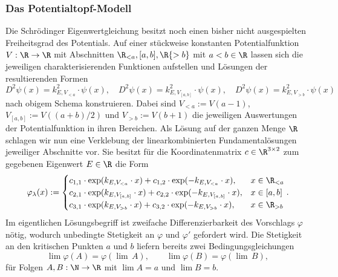 \documentclass[../main.tex]{subfiles}
\begin{document}
        \subsubsection{Das Potentialtopf-Modell}
            Die Schrödinger Eigenwertgleichung besitzt noch einen bisher nicht ausgespielten Freiheitsgrad des Potentials. Auf einer stückweise konstanten Potentialfunktion $V:\R\to\R$ mit Abschnitten $\R_{<a},[a,b],\R{>b}$ mit $a<b\in\R$ lassen sich die jeweiligen charakterisierenden Funktionen aufstellen und Lösungen der resultierenden Formen 
            \[
                D^2\psi(x) = k_{E,V_{<a}}^2\cdot\psi(x),\quad D^2\psi(x) = k_{E,V_{[a,b]}}^2\cdot\psi(x),\quad D^2\psi(x) = k_{E,V_{>b}}^2\cdot\psi(x)
            \] 
            nach obigem Schema konstruieren. Dabei sind $V_{<a}:=V(a - 1)$, $V_{[a,b]}:=V((a + b) / 2)$ und $V_{>b}:=V(b + 1)$ die jeweiligen Auswertungen der Potentialfunktion in ihren Bereichen. Als Lösung auf der ganzen Menge $\R$ schlagen wir nun eine Verklebung der linearkombinierten Fundamentalösungen jeweiliger Abschnitte vor. Sie besitzt für die Koordinatenmatrix $c\in\R^{3\times 2}$ zum gegebenen Eigenwert $E\in\R$ die Form 
            \[
                \varphi_\lambda(x) := \begin{cases}
                    c_{1,1}\cdot \exp(k_{E,V_{<a}}\cdot x) + c_{1,2}\cdot \exp(-k_{E,V_{<a}}\cdot x), & x \in\R_{<a} \\
                    c_{2,1}\cdot \exp(k_{E,V_{[a,b]}}\cdot x) + c_{2,2}\cdot \exp(-k_{E,V_{[a,b]}}\cdot x), & x \in[a,b] \\
                    c_{3,1}\cdot \exp(k_{E,V_{>b}}\cdot x) + c_{3,2}\cdot \exp(-k_{E,V_{>b}}\cdot x), & x \in\R_{>b}
                \end{cases}.
            \]
            Im eigentlichen Lösungsbegriff ist zweifache Differenzierbarkeit des Vorschlags $\varphi$ nötig, wodurch unbedingte Stetigkeit an $\varphi$ und $\varphi'$ gefordert wird. Die Stetigkeit an den kritischen Punkten $a$ und $b$ liefern bereits zwei Bedingungsgleichungen 
            \[
                \lim\varphi(A) = \varphi(\lim\, A),\qquad \lim\varphi(B) = \varphi(\lim\, B),
            \]
            für Folgen $A,B:\N\to\R$ mit $\lim A = a$ und $\lim B = b$. 
            
\end{document}
